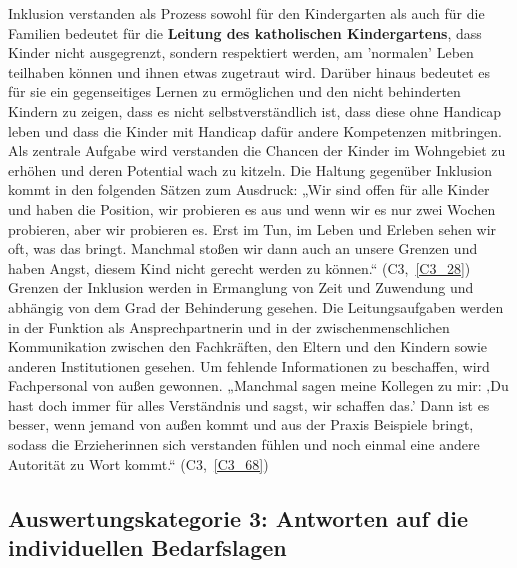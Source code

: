 Inklusion verstanden als Prozess sowohl für den Kindergarten als auch für die Familien bedeutet für die \textbf{Leitung des katholischen Kindergartens}, dass Kinder nicht ausgegrenzt, sondern respektiert werden, am 'normalen' Leben teilhaben können und ihnen etwas zugetraut wird. Darüber hinaus bedeutet es für sie ein gegenseitiges Lernen zu ermöglichen und den nicht behinderten Kindern zu zeigen, dass es nicht selbstverständlich ist, dass diese ohne Handicap leben und dass die Kinder mit Handicap dafür andere Kompetenzen mitbringen. Als zentrale Aufgabe wird verstanden die Chancen der Kinder im Wohngebiet zu erhöhen und deren Potential wach zu kitzeln.
Die Haltung gegenüber Inklusion kommt in den folgenden Sätzen zum Ausdruck: „Wir sind offen für alle Kinder und haben die Position, wir probieren es aus und wenn wir es nur zwei Wochen probieren, aber wir probieren es. Erst im Tun, im Leben und Erleben sehen wir oft, was das bringt. Manchmal stoßen wir dann auch an unsere Grenzen und haben Angst, diesem Kind nicht gerecht werden zu können.“ (C3,~\ref{C3_28}) Grenzen der Inklusion werden in Ermanglung von Zeit und Zuwendung und abhängig von dem Grad der Behinderung gesehen.  
Die Leitungsaufgaben werden in der Funktion als Ansprechpartnerin und in der zwischenmenschlichen Kommunikation zwischen den Fachkräften, den Eltern und den Kindern sowie anderen Institutionen gesehen. Um fehlende Informationen zu beschaffen, wird Fachpersonal von außen gewonnen.
„Manchmal sagen meine Kollegen zu mir: ‚Du hast doch immer für alles Verständnis und sagst, wir schaffen das.’ Dann ist es besser, wenn jemand von außen kommt und aus der Praxis Beispiele bringt, sodass die Erzieherinnen sich verstanden fühlen und noch einmal eine andere Autorität zu Wort kommt.“ (C3,~\ref{C3_68}) 

\subsection{Auswertungskategorie 3: Antworten auf die individuellen Bedarfslagen}

